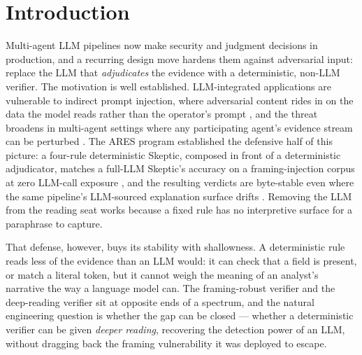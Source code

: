 \documentclass[sigconf,anonymous,review]{acmart}
\begin{document}
\section{Introduction}
Multi-agent LLM pipelines now make security and judgment decisions in production, and a recurring design move hardens them against adversarial input: replace the LLM that \textit{adjudicates} the evidence with a deterministic, non-LLM verifier. The motivation is well established. LLM-integrated applications are vulnerable to indirect prompt injection, where adversarial content rides in on the data the model reads rather than the operator's prompt \citep{greshake-2023}, and the threat broadens in multi-agent settings where any participating agent's evidence stream can be perturbed \citep{guo-2024}. The ARES program established the defensive half of this picture: a four-rule deterministic Skeptic, composed in front of a deterministic adjudicator, matches a full-LLM Skeptic's accuracy on a framing-injection corpus at zero LLM-call exposure \citep{gmys-casiano-2026b}, and the resulting verdicts are byte-stable even where the same pipeline's LLM-sourced explanation surface drifts \citep{gmys-casiano-2026c}. Removing the LLM from the reading seat works because a fixed rule has no interpretive surface for a paraphrase to capture.

That defense, however, buys its stability with shallowness. A deterministic rule reads less of the evidence than an LLM would: it can check that a field is present, or match a literal token, but it cannot weigh the meaning of an analyst's narrative the way a language model can. The framing-robust verifier and the deep-reading verifier sit at opposite ends of a spectrum, and the natural engineering question is whether the gap can be closed --- whether a deterministic verifier can be given \textit{deeper reading}, recovering the detection power of an LLM, without dragging back the framing vulnerability it was deployed to escape.
\end{document}
